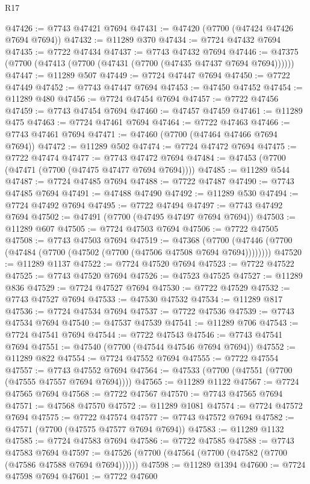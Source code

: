 \begin{lexlean}{R17}
\begin{coremodule}
@47426 := @7743 @47421 @7694
@47431 := @47420 (@7700 (@47424 @47426 @7694 @7694))
@47432 := @11289 @370
@47434 := @7724 @47432 @7694
@47435 := @7722 @47434
@47437 := @7743 @47432 @7694
@47446 := @47375 (@7700 (@47413 (@7700 (@47431 (@7700 (@47435 @47437 @7694 @7694))))))
@47447 := @11289 @507
@47449 := @7724 @47447 @7694
@47450 := @7722 @47449
@47452 := @7743 @47447 @7694
@47453 := @47450 @47452
@47454 := @11289 @480
@47456 := @7724 @47454 @7694
@47457 := @7722 @47456
@47459 := @7743 @47454 @7694
@47460 := @47457 @47459
@47461 := @11289 @475
@47463 := @7724 @47461 @7694
@47464 := @7722 @47463
@47466 := @7743 @47461 @7694
@47471 := @47460 (@7700 (@47464 @47466 @7694 @7694))
@47472 := @11289 @502
@47474 := @7724 @47472 @7694
@47475 := @7722 @47474
@47477 := @7743 @47472 @7694
@47484 := @47453 (@7700 (@47471 (@7700 (@47475 @47477 @7694 @7694))))
@47485 := @11289 @544
@47487 := @7724 @47485 @7694
@47488 := @7722 @47487
@47490 := @7743 @47485 @7694
@47491 := @47488 @47490
@47492 := @11289 @530
@47494 := @7724 @47492 @7694
@47495 := @7722 @47494
@47497 := @7743 @47492 @7694
@47502 := @47491 (@7700 (@47495 @47497 @7694 @7694))
@47503 := @11289 @607
@47505 := @7724 @47503 @7694
@47506 := @7722 @47505
@47508 := @7743 @47503 @7694
@47519 := @47368
    (@7700 (@47446 (@7700 (@47484 (@7700 (@47502 (@7700 (@47506 @47508 @7694 @7694))))))))
@47520 := @11289 @1137
@47522 := @7724 @47520 @7694
@47523 := @7722 @47522
@47525 := @7743 @47520 @7694
@47526 := @47523 @47525
@47527 := @11289 @836
@47529 := @7724 @47527 @7694
@47530 := @7722 @47529
@47532 := @7743 @47527 @7694
@47533 := @47530 @47532
@47534 := @11289 @817
@47536 := @7724 @47534 @7694
@47537 := @7722 @47536
@47539 := @7743 @47534 @7694
@47540 := @47537 @47539
@47541 := @11289 @706
@47543 := @7724 @47541 @7694
@47544 := @7722 @47543
@47546 := @7743 @47541 @7694
@47551 := @47540 (@7700 (@47544 @47546 @7694 @7694))
@47552 := @11289 @822
@47554 := @7724 @47552 @7694
@47555 := @7722 @47554
@47557 := @7743 @47552 @7694
@47564 := @47533 (@7700 (@47551 (@7700 (@47555 @47557 @7694 @7694))))
@47565 := @11289 @1122
@47567 := @7724 @47565 @7694
@47568 := @7722 @47567
@47570 := @7743 @47565 @7694
@47571 := @47568 @47570
@47572 := @11289 @1081
@47574 := @7724 @47572 @7694
@47575 := @7722 @47574
@47577 := @7743 @47572 @7694
@47582 := @47571 (@7700 (@47575 @47577 @7694 @7694))
@47583 := @11289 @1132
@47585 := @7724 @47583 @7694
@47586 := @7722 @47585
@47588 := @7743 @47583 @7694
@47597 := @47526 (@7700 (@47564 (@7700 (@47582 (@7700 (@47586 @47588 @7694 @7694))))))
@47598 := @11289 @1394
@47600 := @7724 @47598 @7694
@47601 := @7722 @47600

\end{coremodule}
\end{lexlean}
